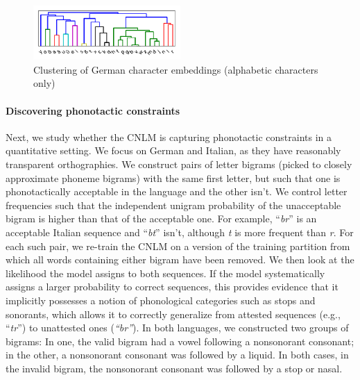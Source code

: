 \begin{figure}
\includegraphics[width=0.50\textwidth]{figures/char-emb-clustering-output_output-phonetic-wiki-german-nospaces-bptt-910515909.pdf}
\caption{Clustering of German character embeddings (alphabetic characters only)}\label{fig:char-clustering}
\end{figure}



\paragraph{Discovering phonotactic constraints}
\label{sec:phonotactics}

Next, we study whether the CNLM is capturing phonotactic constraints
in a quantitative setting.  We focus on German and Italian, as they
have reasonably transparent orthographies.  We construct pairs of
letter bigrams (picked to closely approximate phoneme bigrams) with
the same first letter, but such that one is phonotactically acceptable
in the language and the other isn't. We control letter frequencies
such that the independent unigram probability of the unacceptable
bigram is higher than that of the acceptable one. For example,
``\emph{br}'' is an acceptable Italian sequence and ``\emph{bt}''
isn't, although \emph{t} is more frequent than \emph{r}.  For each
such pair, we re-train the CNLM on a version of the training partition
from which all words containing either bigram have been removed.  We
then look at the likelihood the model assigns to both sequences. If
the model systematically assigns a larger probability to correct
sequences, this provides evidence that it implicitly possesses a
notion of phonological categories such as stops and sonorants, which
allows it to correctly generalize from attested sequences (e.g.,
``\emph{tr}'') to unattested ones (\emph{``br''}). In both languages,
we constructed two groups of bigrams: In one, the valid bigram had a
vowel following a nonsonorant consonant; in the other, a nonsonorant consonant was followed by
a liquid.  In both cases, in the invalid bigram, the nonsonorant consonant was followed by a
stop or nasal.  %

